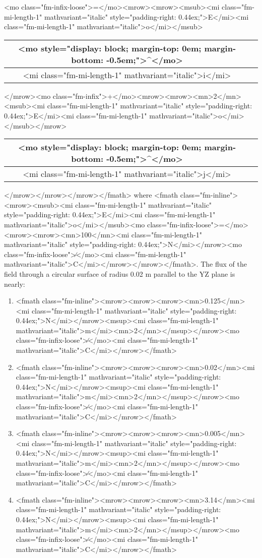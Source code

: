 \documentclass{article}
\begin{document}
<mo class="fm-infix-loose">=</mo><mrow><mrow><msub><mi class="fm-mi-length-1" mathvariant="italic" style="padding-right: 0.44ex;">E</mi><mi class="fm-mi-length-1" mathvariant="italic">o</mi></msub>\begin{tabular}{|c|c|}
\hline
<mo style="display: block; margin-top: 0em; margin-bottom: -0.5em;">^</mo> \\
\hline
<mi class="fm-mi-length-1" mathvariant="italic">i</mi> \\
\hline
\end{tabular}
</mrow><mo class="fm-infix">+</mo><mrow><mrow><mn>2</mn><msub><mi class="fm-mi-length-1" mathvariant="italic" style="padding-right: 0.44ex;">E</mi><mi class="fm-mi-length-1" mathvariant="italic">o</mi></msub></mrow>\begin{tabular}{|c|c|}
\hline
<mo style="display: block; margin-top: 0em; margin-bottom: -0.5em;">^</mo> \\
\hline
<mi class="fm-mi-length-1" mathvariant="italic">j</mi> \\
\hline
\end{tabular}
</mrow></mrow></mrow></fmath> where <fmath class="fm-inline"><mrow><msub><mi class="fm-mi-length-1" mathvariant="italic" style="padding-right: 0.44ex;">E</mi><mi class="fm-mi-length-1" mathvariant="italic">o</mi></msub><mo class="fm-infix-loose">=</mo><mrow><mrow><mn>100</mn><mi class="fm-mi-length-1" mathvariant="italic" style="padding-right: 0.44ex;">N</mi></mrow><mo class="fm-infix-loose">∕</mo><mi class="fm-mi-length-1" mathvariant="italic">C</mi></mrow></mrow></fmath>. The flux of the field through a circular surface of radius 0.02 m parallel to the YZ plane is nearly: 
\begin{enumerate}[label=(\alph*)]
\item <fmath class="fm-inline"><mrow><mrow><mrow><mn>0.125</mn><mi class="fm-mi-length-1" mathvariant="italic" style="padding-right: 0.44ex;">N</mi></mrow><msup><mi class="fm-mi-length-1" mathvariant="italic">m</mi><mn>2</mn></msup></mrow><mo class="fm-infix-loose">∕</mo><mi class="fm-mi-length-1" mathvariant="italic">C</mi></mrow></fmath> 
\item  <fmath class="fm-inline"><mrow><mrow><mrow><mn>0.02</mn><mi class="fm-mi-length-1" mathvariant="italic" style="padding-right: 0.44ex;">N</mi></mrow><msup><mi class="fm-mi-length-1" mathvariant="italic">m</mi><mn>2</mn></msup></mrow><mo class="fm-infix-loose">∕</mo><mi class="fm-mi-length-1" mathvariant="italic">C</mi></mrow></fmath> 
\item  <fmath class="fm-inline"><mrow><mrow><mrow><mn>0.005</mn><mi class="fm-mi-length-1" mathvariant="italic" style="padding-right: 0.44ex;">N</mi></mrow><msup><mi class="fm-mi-length-1" mathvariant="italic">m</mi><mn>2</mn></msup></mrow><mo class="fm-infix-loose">∕</mo><mi class="fm-mi-length-1" mathvariant="italic">C</mi></mrow></fmath> 
\item  <fmath class="fm-inline"><mrow><mrow><mrow><mn>3.14</mn><mi class="fm-mi-length-1" mathvariant="italic" style="padding-right: 0.44ex;">N</mi></mrow><msup><mi class="fm-mi-length-1" mathvariant="italic">m</mi><mn>2</mn></msup></mrow><mo class="fm-infix-loose">∕</mo><mi class="fm-mi-length-1" mathvariant="italic">C</mi></mrow></fmath> 
\end{enumerate}
\newpage
\end{document}
